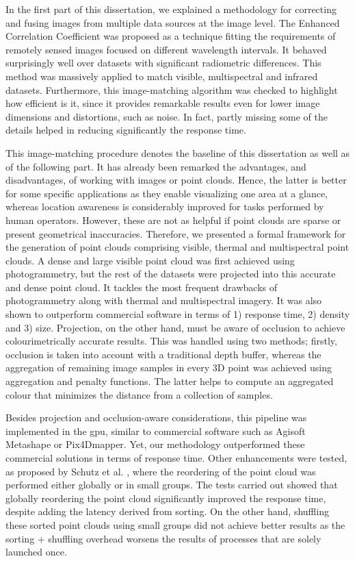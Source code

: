 In the first part of this dissertation, we explained a methodology for correcting and fusing images from multiple data sources at the image level. The Enhanced Correlation Coefficient was proposed as a technique fitting the requirements of remotely sensed images focused on different wavelength intervals. It behaved surprisingly well over datasets with significant radiometric differences. This method was massively applied to match visible, multispectral and infrared datasets. Furthermore, this image-matching algorithm was checked to highlight how efficient is it, since it provides remarkable results even for lower image dimensions and distortions, such as noise. In fact, partly missing some of the details helped in reducing significantly the response time.

This image-matching procedure denotes the baseline of this dissertation as well as of the following part. It has already been remarked the advantages, and disadvantages, of working with images or point clouds. Hence, the latter is better for some specific applications as they enable visualizing one area at a glance, whereas location awareness is considerably improved for tasks performed by human operators. However, these are not as helpful if point clouds are sparse or present geometrical inaccuracies. Therefore, we presented a formal framework for the generation of point clouds comprising visible, thermal and multispectral point clouds. A dense and large visible point cloud was first achieved using photogrammetry, but the rest of the datasets were projected into this accurate and dense point cloud. It tackles the most frequent drawbacks of photogrammetry along with thermal and multispectral imagery. It was also shown to outperform commercial software in terms of 1) response time, 2) density and 3) size. Projection, on the other hand, must be aware of occlusion to achieve colourimetrically accurate results. This was handled using two methods; firstly, occlusion is taken into account with a traditional depth buffer, whereas the aggregation of remaining image samples in every 3D point was achieved using aggregation and penalty functions. The latter helps to compute an aggregated colour that minimizes the distance from a collection of samples. 

Besides projection and occlusion-aware considerations, this pipeline was implemented in the \acrshort{gpu}, similar to commercial software such as Agisoft Metashape or Pix4Dmapper. Yet, our methodology outperformed these commercial solutions in terms of response time. Other enhancements were tested, as proposed by Schutz et al. \cite{schutz_rendering_2021}, where the reordering of the point cloud was performed either globally or in small groups. The tests carried out showed that globally reordering the point cloud significantly improved the response time, despite adding the latency derived from sorting. On the other hand, shuffling these sorted point clouds using small groups did not achieve better results as the sorting + shuffling overhead worsens the results of processes that are solely launched once.  

